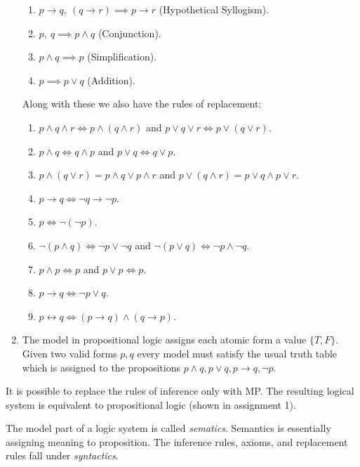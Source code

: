 \begin{example}
\begin{enumerate}
\begin{enumerate}
        \item $p\to q,\ (q\to r)\implies p\to r$ (Hypothetical Syllogism).
        \item $p,\ q \implies p\land q$ (Conjunction).
        \item $p\land q \implies p$ (Simplification).
        \item $p \implies p\lor q$ (Addition).
      \end{enumerate}
      Along with these we also have the rules of replacement:
      \begin{enumerate}
        \item $p\land q\land r \iff p\land(q\land r)$ and $p\lor q\lor r \iff p\lor(q\lor r)$.
        \item $p\land q \iff q\land p$ and $p\lor q \iff q\lor p$.
        \item $p\land(q\lor r) = p\land q \lor p\land r$ and $p\lor(q\land r) = p\lor q \land p\lor r$.
        \item $p\to q \iff \lnot q\to \lnot p$.
        \item $p\iff \lnot (\lnot p)$.
        \item $\lnot (p\land q) \iff \lnot p\lor \lnot q$ and $\lnot (p\lor q) \iff \lnot p\land \lnot q$.
        \item $p\land p\iff p$ and $p\lor p \iff p$.
        \item $p\to q \iff \lnot p\lor q$.
        \item $p\leftrightarrow q \iff (p\to q)\land (q\to p)$.
      \end{enumerate}
    \item The model in propositional logic assigns each atomic form a value $\{T, F\}$. Given two valid forms $p,q$ every model must satisfy the usual truth table which is assigned to the propositions $p\land q,p\lor q, p\to q, \lnot p$.
  \end{enumerate}
\end{example}
\begin{remark}
  It is possible to replace the rules of inference only with MP. The resulting logical system is equivalent to propositional logic (shown in assignment 1).
\end{remark}
The model part of a logic system is called \textit{sematics}. Semantics is essentially assigning meaning to proposition. The inference rules, axioms, and replacement rules fall under \textit{syntactics}. 
